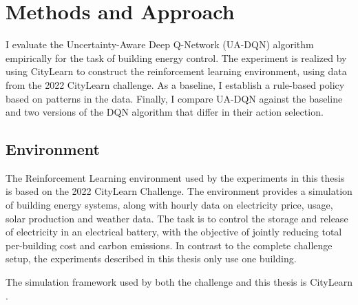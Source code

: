 \chapter{Methods and Approach}
    \label{approach}

I evaluate the Uncertainty-Aware Deep Q-Network (UA-DQN) algorithm empirically for the task of building energy control.
The experiment is realized by using CityLearn to construct the reinforcement learning environment, using data from the 2022 CityLearn challenge.
As a baseline, I establish a rule-based policy based on patterns in the data.
Finally, I compare UA-DQN against the baseline and two versions of the DQN algorithm that differ in their action selection.





\section{Environment}
The Reinforcement Learning environment used by the experiments in this thesis is based on the 2022 CityLearn Challenge.
The environment provides a simulation of building energy systems, along with hourly data on electricity price, usage, solar production and weather data.
The task is to control the storage and release of electricity in an electrical battery, with the objective of jointly reducing total per-building cost and carbon emissions.
In contrast to the complete challenge setup, the experiments described in this thesis only use one building.

The simulation framework used by both the challenge and this thesis is CityLearn \cite{vazquez-canteli2019CityLearnV1OpenAI}.

